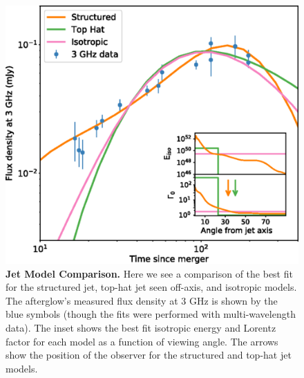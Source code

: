 \documentclass[11pt]{cuthesis}
\begin{document}
\begin{figure} %
\begin{center}
\includegraphics[width=1.0\linewidth]{grb_model_comparison.png}
\end{center}
\caption{\textbf{Jet Model Comparison.} Here we see a comparison of the best fit for the structured jet, top-hat jet seen off-axis, and isotropic models. The afterglow's measured flux density at 3 GHz is shown by the blue symbols (though the fits were performed with multi-wavelength data). The inset shows the best fit isotropic energy and Lorentz factor for each model as a function of viewing angle. The arrows show the position of the observer for the structured and top-hat jet models.\cite{Lazzati_afterglow} }
\label{fig:model comparison}
\end{figure}
\end{document}
